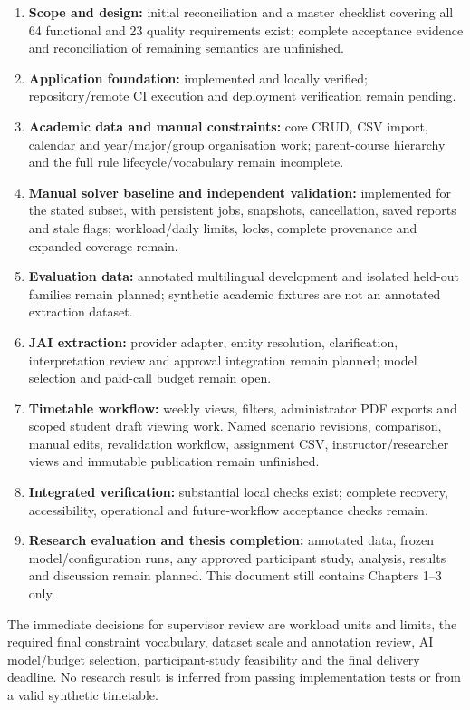 \documentclass[
  11pt,a4paper,oneside]{report}
\begin{document}
\begin{enumerate}
\item \textbf{Scope and design:} initial reconciliation and a master checklist covering all 64 functional and 23 quality requirements exist; complete acceptance evidence and reconciliation of remaining semantics are unfinished.
\item \textbf{Application foundation:} implemented and locally verified; repository/remote CI execution and deployment verification remain pending.
\item \textbf{Academic data and manual constraints:} core CRUD, CSV import, calendar and year/major/group organisation work; parent-course hierarchy and the full rule lifecycle/vocabulary remain incomplete.
\item \textbf{Manual solver baseline and independent validation:} implemented for the stated subset, with persistent jobs, snapshots, cancellation, saved reports and stale flags; workload/daily limits, locks, complete provenance and expanded coverage remain.
\item \textbf{Evaluation data:} annotated multilingual development and isolated held-out families remain planned; synthetic academic fixtures are not an annotated extraction dataset.
\item \textbf{JAI extraction:} provider adapter, entity resolution, clarification, interpretation review and approval integration remain planned; model selection and paid-call budget remain open.
\item \textbf{Timetable workflow:} weekly views, filters, administrator PDF exports and scoped student draft viewing work. Named scenario revisions, comparison, manual edits, revalidation workflow, assignment CSV, instructor/researcher views and immutable publication remain unfinished.
\item \textbf{Integrated verification:} substantial local checks exist; complete recovery, accessibility, operational and future-workflow acceptance checks remain.
\item \textbf{Research evaluation and thesis completion:} annotated data, frozen model/configuration runs, any approved participant study, analysis, results and discussion remain planned. This document still contains Chapters 1--3 only.
\end{enumerate}
The immediate decisions for supervisor review are workload units and limits, the required final constraint vocabulary, dataset scale and annotation review, AI model/budget selection, participant-study feasibility and the final delivery deadline. No research result is inferred from passing implementation tests or from a valid synthetic timetable.
\end{document}
